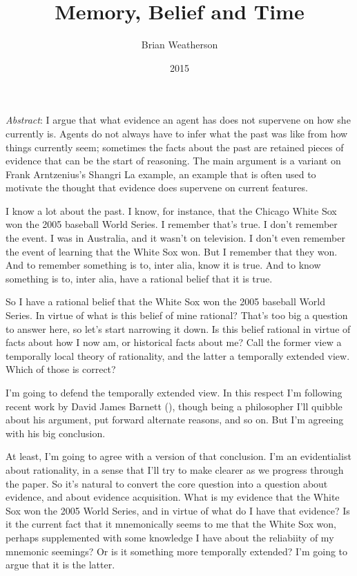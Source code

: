 \documentclass[
  11pt,
  letterpaper,
  DIV=11,
  numbers=noendperiod,
  twoside]{scrartcl}
\title{Memory, Belief and Time}
\author{Brian Weatherson}
\date{2015}
\renewenvironment{abstract}
 {\vspace{-1.25cm}
 \quotation\small\noindent\emph{Abstract}:}
 {\endquotation}
\begin{document}
\maketitle
\begin{abstract}
I argue that what evidence an agent has does not supervene on how she
currently is. Agents do not always have to infer what the past was like
from how things currently seem; sometimes the facts about the past are
retained pieces of evidence that can be the start of reasoning. The main
argument is a variant on Frank Arntzenius's Shangri La example, an
example that is often used to motivate the thought that evidence does
supervene on current features.
\end{abstract}


I know a lot about the past. I know, for instance, that the Chicago
White Sox won the 2005 baseball World Series. I remember that's true. I
don't remember the event. I was in Australia, and it wasn't on
television. I don't even remember the event of learning that the White
Sox won. But I remember that they won. And to remember something is to,
inter alia, know it is true. And to know something is to, inter alia,
have a rational belief that it is true.

So I have a rational belief that the White Sox won the 2005 baseball
World Series. In virtue of what is this belief of mine rational? That's
too big a question to answer here, so let's start narrowing it down. Is
this belief rational in virtue of facts about how I now am, or
historical facts about me? Call the former view a temporally local
theory of rationality, and the latter a temporally extended view. Which
of those is correct?

I'm going to defend the temporally extended view. In this respect I'm
following recent work by David James Barnett
(), though being a philosopher I'll
quibble about his argument, put forward alternate reasons, and so on.
But I'm agreeing with his big conclusion.

At least, I'm going to agree with a version of that conclusion. I'm an
evidentialist about rationality, in a sense that I'll try to make
clearer as we progress through the paper. So it's natural to convert the
core question into a question about evidence, and about evidence
acquisition. What is my evidence that the White Sox won the 2005 World
Series, and in virtue of what do I have that evidence? Is it the current
fact that it mnemonically seems to me that the White Sox won, perhaps
supplemented with some knowledge I have about the reliabiity of my
mnemonic seemings? Or is it something more temporally extended? I'm
going to argue that it is the latter.
\end{document}
